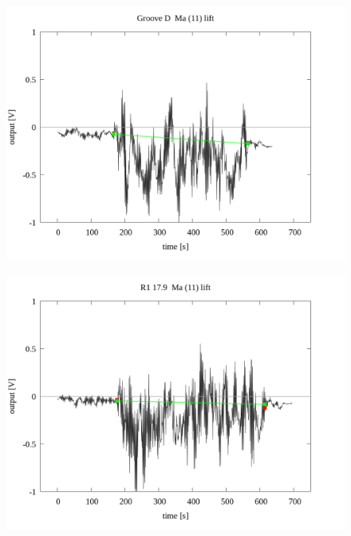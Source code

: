 \documentclass[a4paper]{jsarticle}
\begin{document}
\begin{figure}[htbp]
    \footnotesize
    \begin{center}
        \includegraphics[width=140mm]{../../../../33_result/210806/moving_average/11/lift/03/Groove_D_ma(11)_lift_03.png}
    \end{center}
\end{figure}

\begin{figure}[htbp]
    \footnotesize
    \begin{center}
        \includegraphics[width=140mm]{../../../../33_result/210806/moving_average/11/lift/03/R1_17.9_ma(11)_lift_03.png}
    \end{center}
\end{figure}
\end{document}
